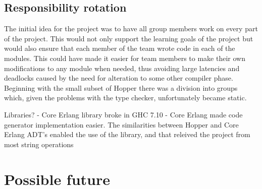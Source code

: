 \subsection{Responsibility rotation}

The initial idea for the project was to have all group members work on every part of the project. This would not only support the learning goals of the project but would also ensure that each member of the team wrote code in each of the modules. This could have made it easier for team members to make their own modifications to any module when needed, thus avoiding large latencies and deadlocks caused by the need for alteration to some other compiler phase. 
Beginning with the small subset of Hopper there was a division into groups which, given the problems with the type checker, unfortunately became static.




Libraries?
- Core Erlang library broke in GHC 7.10
- Core Erlang made code generator implementation easier. The similarities between Hopper and Core Erlang ADT's enabled the use of the library, and that releived the project from most string operations


\section{Possible future}

